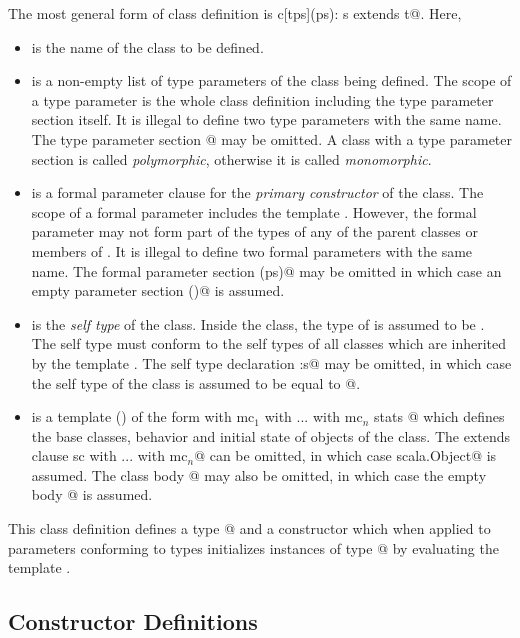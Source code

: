 \documentclass[11pt]{report}
\begin{document}
The most general form of class definition is 
\verb@class c[tps](ps): s extends t@.
Here,
\begin{itemize}
\item[]
\verb@c@ is the name of the class to be defined.
\item[] \verb@tps@ is a non-empty list of type parameters of the class
being defined.  The scope of a type parameter is the whole class
definition including the type parameter section itself.  It is
illegal to define two type parameters with the same name.  The type
parameter section \verb@[tps]@ may be omitted. A class with a type
parameter section is called {\em polymorphic}, otherwise it is called
{\em monomorphic}.
\item[] 
\verb@ps@ is a formal parameter clause for the {\em primary
constructor} of the class. The scope of a formal parameter includes
the template \verb@t@. However, the formal parameter may not form 
part of the types of any of the parent classes or members of \verb@t@.
It is illegal to define two formal parameters with the same name.
The formal parameter section \verb@(ps)@ may be omitted in which case
an empty parameter section \verb@()@ is assumed.
\item[] 
\verb@s@ is the {\em self type} of the class. Inside the
class, the type of \verb@this@ is assumed to be \verb@s@.  The self
type must conform to the self types of all classes which are inherited
by the template \verb@t@. The self type declaration \verb@:s@ may be
omitted, in which case the self type of the class is assumed to be
equal to \verb@c[tps]@.
\item[] 
\verb@t@ is a
template () of the form
\verb@sc with mc$_1$ with ... with mc$_n$ { stats }@
which defines the base classes, behavior and initial state of objects of
the class. The extends clause \verb@extends sc with ... with mc$_n$@
can be omitted, in which case
\verb@extends scala.Object@ is assumed.  The class body
@ may also be omitted, in which case the empty body
\verb@{}@ is assumed.
\end{itemize}
This class definition defines a type \verb@c[tps]@ and a constructor
which when applied to parameters conforming to types \verb@ps@
initializes instances of type \verb@c[tps]@ by evaluating the template
\verb@t@.

\subsection{Constructor Definitions}
\end{document}
